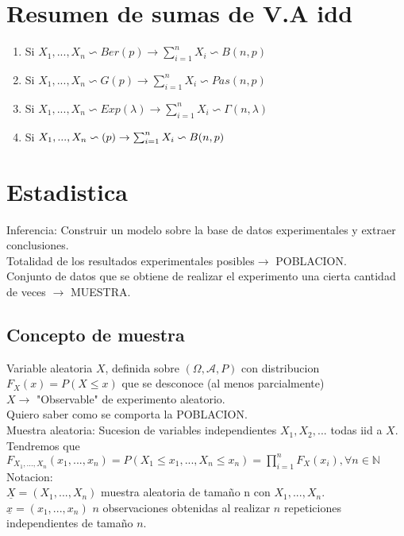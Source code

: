 \documentclass[titlepage,a4paper]{article}
\begin{document}
\section{Resumen de sumas de V.A idd}
\begin{enumerate}
    \item Si $X_{1},...,X_{n} \backsim Ber(p) \rightarrow \sum_{i=1}^{n} X_{i} \backsim  B(n,p)$
    \item Si $X_{1},...,X_{n} \backsim G(p) \rightarrow \sum_{i=1}^{n} X_{i} \backsim  Pas(n,p)$
    \item Si $X_{1},...,X_{n} \backsim Exp(\lambda) \rightarrow \sum_{i=1}^{n} X_{i} \backsim  \Gamma(n,\lambda)$
    \item Si $X_{1},...,X_{n} \backsim \author{}(p) \rightarrow \sum_{i=1}^{n} X_{i} \backsim  B(n,p)$
\end{enumerate}
\section{Estadistica}
Inferencia: Construir un modelo sobre la base de datos experimentales y extraer conclusiones.\\
Totalidad de los resultados experimentales posibles$\rightarrow$ POBLACION. \\ 
Conjunto de datos que se obtiene de realizar el experimento una cierta cantidad de veces $\rightarrow$ MUESTRA. 
\subsection{Concepto de muestra}
Variable aleatoria $X$, definida sobre $(\Omega,\mathcal{A},P)$ con distribucion $F_{X}(x) = P(X \leq x)$ que se desconoce (al menos parcialmente)\\
$X \rightarrow $ "Observable" de experimento aleatorio.\\
Quiero saber como se comporta la POBLACION.\\
Muestra aleatoria: Sucesion de variables independientes $X_{1},X_{2},...$ todas iid a $X$.\\
Tendremos que $F_{X_{1},...,X_{n}}(x_{1},...,x_{n}) = P(X_{1} \leq x_{1},...,X_{n} \leq x_{n}) = \prod_{i=1}^{n} F_{X}(x_{i}), \forall n \in \mathbb{N}$\\
Notacion:\\
$\underline{X} = (X_{1},...,X_{n})$ muestra aleatoria de tamaño n con $X_{1},...,X_{n}$.\\
$\underline{x} = (x_{1},...,x_{n})$ $n$ observaciones obtenidas al realizar $n$ repeticiones independientes de tamaño $n$.
\end{document}

